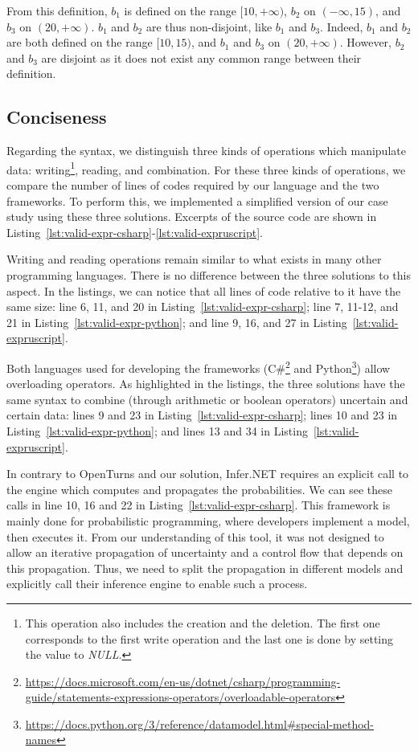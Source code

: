 From this definition, $b_1$ is defined on the range $[10, +\infty)$, $b_2$ on $(-\infty, 15)$, and $b_3$ on $(20, +\infty)$.
$b_1$ and $b_2$ are thus non-disjoint, like $b_1$ and $b_3$.
Indeed, $b_1$ and $b_2$ are both defined on the range $[10, 15)$, and $b_1$ and $b_3$ on $(20, +\infty)$.
However, $b_2$ and $b_3$ are disjoint as it does not exist any common range between their definition.

\subsection{Conciseness}
Regarding the syntax, we distinguish three kinds of operations which manipulate data: writing\footnote{This operation also includes the creation and the deletion. 
The first one corresponds to the first write operation and the last one is done by setting the value to \textit{NULL}.}, reading, and combination. 
For these three kinds of operations, we compare the number of lines of codes required by our language and the two frameworks.
To perform this, we implemented a simplified version of our case study using these three solutions.
Excerpts of the source code are shown in Listing~\ref{lst:valid-expr-csharp}-\ref{lst:valid-expruscript}.

Writing and reading operations remain similar to what exists in many other programming languages.
There is no difference between the three solutions to this aspect.
In the listings, we can notice that all lines of code relative to it have the same size: line 6, 11, and 20 in Listing~\ref{lst:valid-expr-csharp}; line 7, 11-12, and 21 in Listing~\ref{lst:valid-expr-python}; and line 9, 16, and 27 in Listing~\ref{lst:valid-expruscript}.

Both languages used for developing the frameworks (C\#\footnote{\url{https://docs.microsoft.com/en-us/dotnet/csharp/programming-guide/statements-expressions-operators/overloadable-operators}} and Python\footnote{\url{https://docs.python.org/3/reference/datamodel.html\#special-method-names}}) allow overloading operators.
As highlighted in the listings, the three solutions have the same syntax to combine (through arithmetic or boolean operators) uncertain and certain data: lines 9 and 23 in Listing~\ref{lst:valid-expr-csharp}; lines 10 and 23 in Listing~\ref{lst:valid-expr-python}; and lines 13 and 34 in Listing~\ref{lst:valid-expruscript}.

In contrary to OpenTurns and our solution, Infer.NET requires an explicit call to the engine which computes and propagates the probabilities.
We can see these calls in line 10, 16 and 22 in Listing~\ref{lst:valid-expr-csharp}.
This framework is mainly done for probabilistic programming, where developers implement a model, then executes it.
From our understanding of this tool, it was not designed to allow an iterative propagation of uncertainty and a control flow that depends on this propagation.
Thus, we need to split the propagation in different models and explicitly call their inference engine to enable such a process.

